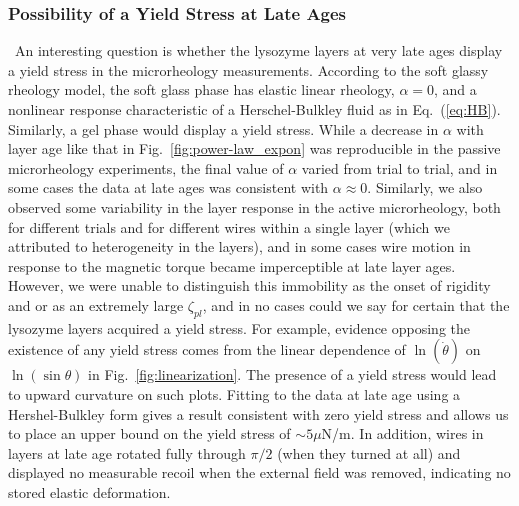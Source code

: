 \subsubsection{Possibility of a Yield Stress at Late Ages}~An interesting question is whether the lysozyme layers at very late ages display a yield stress in the microrheology measurements.  According to the soft glassy rheology model, the soft glass phase has elastic linear rheology, $\alpha = 0$, and a nonlinear response characteristic of a Herschel-Bulkley fluid as in Eq.~(\ref{eq:HB}).   Similarly, a gel phase would display a yield stress.  While a decrease in $\alpha$ with layer age like that in Fig.~\ref{fig:power-law_expon} was reproducible in the passive microrheology experiments, the final value of $\alpha$ varied from trial to trial, and in some cases the data at late ages was consistent with $\alpha \approx 0$.  Similarly, we also observed some variability in the layer response in the active microrheology, both for different trials and for different wires within a single layer (which we attributed to heterogeneity in the layers), and in some cases wire motion in response to the magnetic torque became imperceptible at late layer ages.  However, we were unable to distinguish this immobility as the onset of rigidity and or as an extremely large $\zeta_{pl}$, and in no cases could we say for certain that the lysozyme layers acquired a yield stress.  For example, evidence opposing the existence of any yield stress comes from the linear dependence of $\ln(\dot{\theta})$ on $\ln(\sin\theta)$ in Fig.~\ref{fig:linearization}. The presence of a yield stress would lead to upward curvature on such plots.  Fitting to the data at late age using a Hershel-Bulkley form gives a result consistent with zero yield stress and allows us to place an upper bound on the yield stress of $\sim 5 \mu$N/m.  In addition, wires in layers at late age rotated fully through $\pi/2$ (when they turned at all) and displayed no measurable recoil when the external field was removed, indicating no stored elastic deformation.   


